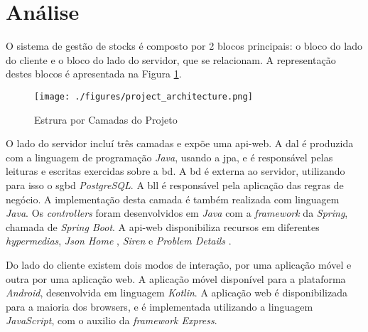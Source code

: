 %
%
\section{Análise}\label{sec32}

O sistema de gestão de stocks é composto por 2 blocos principais: o bloco do lado do cliente e o bloco do lado do servidor, que se relacionam. A representação destes blocos é apresentada na Figura \ref{project-layers-structure}. 

\begin{figure}[H]
	\centering
	\texttt{[image: ./figures/project\_architecture.png]}
	\caption{Estrura por Camadas do Projeto}
	\label{project-layers-structure}
\end{figure}

O lado do servidor incluí três camadas e expõe uma \gls{api-web}. A \acrfull{dal} é produzida com a linguagem de programação \textit{Java}, usando a \acrfull{jpa}, e é responsável pelas leituras e escritas exercidas sobre a \acrfull{bd}. A \acrshort{bd} é externa ao servidor, utilizando para isso o \acrfull{sgbd} \textit{PostgreSQL}. A \acrfull{bll} é responsável pela aplicação das regras de negócio. A implementação desta camada é também realizada com linguagem \textit{Java}. Os \textit{controllers} foram desenvolvidos em \textit{Java} com a \textit{framework} da \textit{Spring}, chamada de \textit{Spring Boot}. A \gls{api-web} disponibiliza recursos em diferentes \textit{hypermedias}, \textit{Json Home} \cite{draftnot72:jsonHome}, \textit{Siren} \cite{kevinswiber:siren} e \textit{Problem Details} \cite{RFC7807:problemDetails}.

Do lado do cliente existem dois modos de interação, por uma aplicação móvel e outra por uma aplicação web. A aplicação móvel disponível para a plataforma \textit{Android}, desenvolvida em linguagem \textit{Kotlin}. A aplicação web é disponibilizada para a maioria dos browsers, e é implementada utilizando a linguagem \textit{JavaScript}, com o auxilio da \textit{framework Express}.
